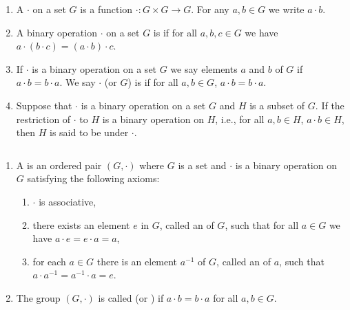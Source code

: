 \begin{definition}
	$ $
	\begin{enumerate}
		\item A  $\cdot$ on a set $G$ is a function $\cdot : G 
		\times G \to G$. For any $a,b \in G$ we	write $a \cdot b$.
		
		\item A binary operation $\cdot$ on a set $G$ is 
		 if for all 
		$a,b,c \in G$ we have $a \cdot (b \cdot c) = (a \cdot b) 
		\cdot c$.
		
		\item If $\cdot$ is a binary operation on a set $G$ we say 
		elements $a$ and $b$ of $G$  if $a \cdot b = b \cdot a$. We say 
		$\cdot$ (or $G$) is  if for all $a,b \in 
		G$, $a \cdot b = b \cdot a$.
		
		\item Suppose that $\cdot$ is a binary operation on a set 
		$G$ and $H$ is a subset of $G$. If the restriction of 
		$\cdot$ to $H$ is a binary operation on $H$, i.e., for all 
		$a,b \in H$, $a \cdot b \in H$, then $H$ is said to be 
		under $\cdot$.
	\end{enumerate}
\end{definition}

\begin{definition}[Group]
	$ $
	\begin{enumerate}
		\item A  is an ordered 
		pair $(G,\cdot)$ where $G$ is a set and $\cdot$ is a binary 
		operation on $G$ satisfying the following axioms:
		\begin{enumerate}
			\item $\cdot$ is associative,
			
			\item there exists an element $e$ in $G$, called an 
			 of 
			$G$, such that for all $a \in G$ we have $a \cdot e = e 
			\cdot a = a$,
			
			\item for each $a \in G$ there is an element $a^{-1}$ 
			of $G$, called an  of $a$, such that $a 
				\cdot 
			a^{-1} = a^{-1} \cdot a = e$.
		\end{enumerate}
		
		\item The group $(G, \cdot)$ is called 
		 (or 
		) if 
		$a \cdot b = b \cdot a$ for all $a,b \in G$.
	\end{enumerate}
\end{definition}

